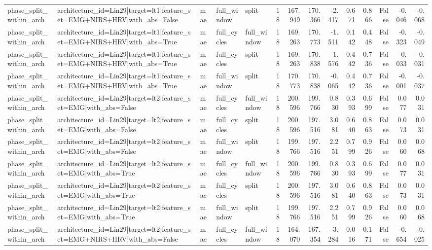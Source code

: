 \begin{table}
\begin{tabular}{lllllrrrrrrrrr}
phase_split_within_arch & architecture_id=Lin29|target=lt1|feature_set=EMG+NIRS+HRV|with_abs=False & mae & full_window & split & 18 & 167.949 & 170.366 & -2.417 & 0.671 & 0.866 & False & -0.046 & -0.068 \\
phase_split_within_arch & architecture_id=Lin29|target=lt1|feature_set=EMG+NIRS+HRV|with_abs=True & mae & full_cycles & full_window & 18 & 169.263 & 170.773 & -1.511 & 0.142 & 0.448 & False & -0.323 & -0.049 \\
phase_split_within_arch & architecture_id=Lin29|target=lt1|feature_set=EMG+NIRS+HRV|with_abs=True & mae & full_cycles & split & 18 & 169.263 & 170.838 & -1.576 & 0.442 & 0.736 & False & -0.033 & -0.031 \\
phase_split_within_arch & architecture_id=Lin29|target=lt1|feature_set=EMG+NIRS+HRV|with_abs=True & mae & full_window & split & 18 & 170.773 & 170.838 & -0.065 & 0.442 & 0.736 & False & -0.001 & -0.037 \\
phase_split_within_arch & architecture_id=Lin29|target=lt2|feature_set=EMG|with_abs=False & mae & full_cycles & full_window & 18 & 200.596 & 199.766 & 0.830 & 0.393 & 0.699 & False & 0.077 & 0.031 \\
phase_split_within_arch & architecture_id=Lin29|target=lt2|feature_set=EMG|with_abs=False & mae & full_cycles & split & 18 & 200.596 & 197.516 & 3.081 & 0.640 & 0.863 & False & 0.073 & 0.031 \\
phase_split_within_arch & architecture_id=Lin29|target=lt2|feature_set=EMG|with_abs=False & mae & full_window & split & 18 & 199.766 & 197.516 & 2.251 & 0.799 & 0.926 & False & 0.060 & 0.068 \\
phase_split_within_arch & architecture_id=Lin29|target=lt2|feature_set=EMG|with_abs=True & mae & full_cycles & full_window & 18 & 200.596 & 199.766 & 0.830 & 0.393 & 0.699 & False & 0.077 & 0.031 \\
phase_split_within_arch & architecture_id=Lin29|target=lt2|feature_set=EMG|with_abs=True & mae & full_cycles & split & 18 & 200.596 & 197.516 & 3.081 & 0.640 & 0.863 & False & 0.073 & 0.031 \\
phase_split_within_arch & architecture_id=Lin29|target=lt2|feature_set=EMG|with_abs=True & mae & full_window & split & 18 & 199.766 & 197.516 & 2.251 & 0.799 & 0.926 & False & 0.060 & 0.068 \\
phase_split_within_arch & architecture_id=Lin29|target=lt2|feature_set=EMG+NIRS+HRV|with_abs=False & mae & full_cycles & full_window & 18 & 164.070 & 167.354 & -3.284 & 0.016 & 0.171 & False & -0.654 & -0.025 \\

\end{tabular}
\end{table}
